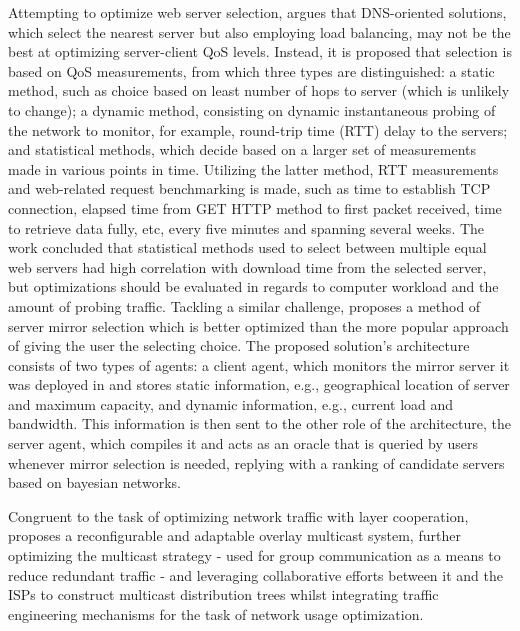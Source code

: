         Attempting to optimize web server selection, \cite{kenichi} argues that DNS-oriented solutions, which select the nearest server but also employing load balancing, may not be the best at optimizing server-client QoS levels.
        Instead, it is proposed that selection is based on QoS measurements, from which three types are distinguished: a static method, such as choice based on least number of hops to server (which is unlikely to change); a dynamic method, consisting on dynamic instantaneous probing of the network to monitor, for example, round-trip time (RTT) delay to the servers; and statistical methods, which decide based on a larger set of measurements made in various points in time.
        Utilizing the latter method, RTT measurements and web-related request benchmarking is made, such as time to establish TCP connection, elapsed time from GET HTTP method to first packet received, time to retrieve data fully, etc, every five minutes and spanning several weeks.
        The work concluded that statistical methods used to select between multiple equal web servers had high correlation with download time from the selected server, but optimizations should be evaluated in regards to computer workload and the amount of probing traffic.
        Tackling a similar challenge, \cite{swain} proposes a method of server mirror selection which is better optimized than the more popular approach of giving the user the selecting choice.
        The proposed solution's architecture consists of two types of agents: a client agent, which monitors the mirror server it was deployed in and stores static information, e.g., geographical location of server and maximum capacity, and dynamic information, e.g., current load and bandwidth.
        This information is then sent to the other role of the architecture, the server agent, which compiles it and acts as an oracle that is queried by users whenever mirror selection is needed, replying with a ranking of candidate servers based on bayesian networks.

        Congruent to the task of optimizing network traffic with layer cooperation, \cite{adaptable-overlay} proposes a reconfigurable and adaptable overlay multicast system, further optimizing the multicast strategy - used for group communication as a means to reduce redundant traffic - and leveraging collaborative efforts between it and the ISPs to construct multicast distribution trees whilst integrating traffic engineering mechanisms for the task of network usage optimization.

